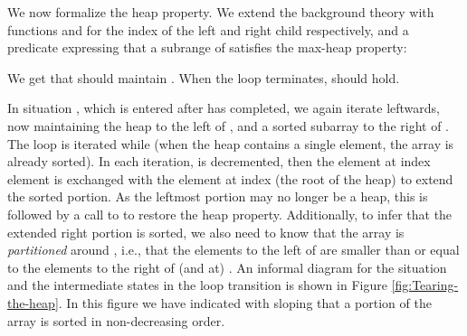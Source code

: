 \documentclass[english,submission]{eptcs}
\begin{document}
We now formalize the heap property. We extend the 
background theory with functions  and  for
the index of the left and right child respectively, and a predicate
 expressing that a subrange of  satisfies
the max-heap property:
\begin{quote}

\end{quote}
\noindent We get that  should maintain .
When the loop terminates,  should hold.

In situation , which is entered after 
has completed, we again iterate leftwards, now maintaining the heap
to the left of , and a sorted subarray to the right of
. The loop is iterated while  (when the
heap contains a single element, the array is already sorted). In each
iteration,  is decremented, then the element at index
 element is exchanged with the element at index 
(the root of the heap) to extend the sorted portion. As the leftmost
portion may no longer be a heap, this is followed by a call to 
to restore the heap property. Additionally, to infer that the extended
right portion is sorted, we also need to know that the array is \emph{partitioned}
around , i.e., that the elements to the left of 
are smaller than or equal to the elements to the right of (and at)
. An informal diagram for the  situation
and the intermediate states in the loop transition is shown in Figure
\ref{fig:Tearing-the-heap}. In this figure we have indicated with
sloping that a portion of the array is sorted in non-decreasing order.
\end{document}
